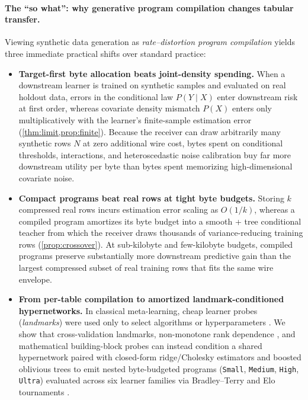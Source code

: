\paragraph{The ``so what'': why generative program compilation changes tabular transfer.}
Viewing synthetic data generation as \emph{rate--distortion program compilation} yields three immediate
practical shifts over standard practice:
\begin{itemize}[leftmargin=1.4em,itemsep=2pt,topsep=2pt]
\item \textbf{Target-first byte allocation beats joint-density spending.} When a downstream learner is
  trained on synthetic samples and evaluated on real holdout data, errors in the conditional law
  $P(Y\mid X)$ enter downstream risk at first order, whereas covariate density mismatch $P(X)$ enters
  only multiplicatively with the learner's finite-sample estimation error (\cref{thm:limit,prop:finite}).
  Because the receiver can draw arbitrarily many synthetic rows $N$ at zero additional wire cost, bytes
  spent on conditional thresholds, interactions, and heteroscedastic noise calibration buy far more
  downstream utility per byte than bytes spent memorizing high-dimensional covariate noise.
\item \textbf{Compact programs beat real rows at tight byte budgets.} Storing $k$ compressed real rows
  incurs estimation error scaling as $O(1/k)$, whereas a compiled program amortizes its byte budget into
  a smooth + tree conditional teacher from which the receiver draws thousands of variance-reducing
  training rows (\cref{prop:crossover}). At sub-kilobyte and few-kilobyte budgets, compiled programs
  preserve substantially more downstream predictive gain than the largest compressed subset of real
  training rows that fits the same wire envelope.
\item \textbf{From per-table compilation to amortized landmark-conditioned hypernetworks.} In classical
  meta-learning, cheap learner probes (\emph{landmarks}) were used only to select algorithms or
  hyperparameters \citep{pfahringer2000landmarking,bardenet2013collaborative,feurer2015autosklearn,vanschoren2018metalearning}.
  We show that cross-validation landmarks, non-monotone rank dependence \citep{chatterjee2021xi}, and
  mathematical building-block probes can instead condition a shared hypernetwork
  \citep{ha2017hypernetworks,perez2018film,garnelo2018cnp} paired with closed-form ridge/Cholesky
  estimators \citep{ledoit2004shrinkage,bertinetto2019closedform} and boosted oblivious trees
  \citep{prokhorenkova2018catboost} to emit nested byte-budgeted programs (\texttt{Small},
  \texttt{Medium}, \texttt{High}, \texttt{Ultra}) evaluated across six learner families via
  Bradley--Terry and Elo tournaments \citep{bradley1952rank,hunter2004mm,elo1978rating}.
\end{itemize}

